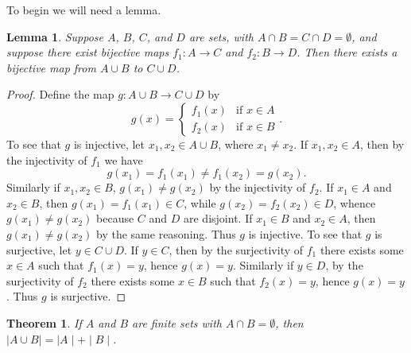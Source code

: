 \documentclass[12pt]{article}
\theoremstyle{plain}
\newtheorem*{thm}{Theorem}
\newtheorem*{lem}{Lemma}
\begin{document}
To begin we will need a lemma. 
\begin{lem}
Suppose $A$, $B$, $C$, and $D$ are sets, with $A\cap B=C\cap D=\emptyset$, and suppose there exist bijective maps $f_1:A\rightarrow C$ and $f_2:B\rightarrow D$. Then 
there exists a bijective map from $A\cup B$ to $C\cup D$. 
\end{lem}
\begin{proof}
Define the map $g:A\cup B\rightarrow C\cup D$ by 
\begin{equation}
g(x)=
\begin{cases}
f_1(x)&\text{if }x\in A\\
f_2(x)&\text{if }x\in B
\end{cases}\text{.}
\end{equation}
To see that $g$ is injective, let $x_1,x_2\in A\cup B$, where $x_1\neq x_2$. If $x_1,x_2\in A$, then by the injectivity of $f_1$ we have
\begin{equation}
g(x_1)=f_1(x_1)\neq f_1(x_2)=g(x_2)\text{.}
\end{equation}
Similarly if $x_1,x_2\in B$, $g(x_1)\neq g(x_2)$ by the injectivity of $f_2$. If $x_1\in A$ and $x_2\in B$, then $g(x_1)=f_1(x_1)\in C$, while $g(x_2)=f_2(x_2)\in D$, whence $g(x_1)\neq g(x_2)$ because $C$ and $D$ are disjoint. If $x_1\in B$ and $x_2\in A$, then $g(x_1)\neq g(x_2)$ by the same reasoning. Thus $g$ is injective. To see that $g$ is surjective, let $y\in C\cup D$. If $y\in C$, then by the surjectivity of $f_1$ there exists some $x\in A$ such that $f_1(x)=y$, hence $g(x)=y$. Similarly if $y\in D$, by the surjectivity of $f_2$ there exists some $x\in B$ such that $f_2(x)=y$, hence $g(x)=y$. Thus $g$ is surjective. 
\end{proof}
\begin{thm}
If $A$ and $B$ are finite sets with $A\cap B=\emptyset$, then $\mid A\cup B\mid=\mid A\mid +\mid B\mid$. 
\end{thm}
\end{document}
